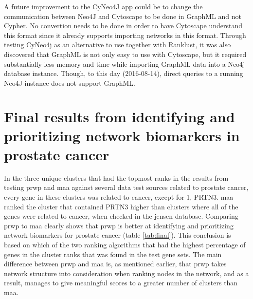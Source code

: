 A future improvement to the CyNeo4J app could be to change the communication
between Neo4J and Cytoscape to be done in GraphML and not Cypher. No convertion
needs to be done in order to have Cytoscape understand this format since it
already supports importing networks in this format. Through testing CyNeo4j as
an alternative to use together with Ranklust, it was also discovered that
GraphML is not only easy to use with Cytoscape, but it required substantially
less memory and time while importing GraphML data into a Neo4j database
instance. Though, to this day (2016-08-14), direct queries to a running Neo4J
instance does not support GraphML.

\section{Final results from identifying and prioritizing network biomarkers in prostate cancer}
In the three unique clusters that had the topmost ranks in the results from
testing \gls{prwp} and \gls{maa} against several data test sources related to
prostate cancer, every gene in these clusters was related to cancer, except for
1, PRTN3. \gls{maa} ranked the cluster that contained PRTN3 higher than clusters
where all of the genes were related to cancer, when checked in the \gls{jensen}
database. Comparing \gls{prwp} to \gls{maa} clearly shows that \gls{prwp} is
better at identifying and prioritizing network biomarkers for prostate cancer
(table \ref{tab:final}). This conclusion is based on which of the two ranking
algorithms that had the highest percentage of genes in the cluster ranks that
was found in the test gene sets. The main difference between \gls{prwp} and
\gls{maa} is, as mentioned earlier, that \gls{prwp} takes network structure into
consideration when ranking nodes in the network, and as a result, manages to
give meaningful scores to a greater number of clusters than \gls{maa}.
